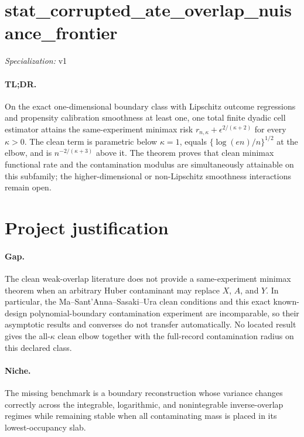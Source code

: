 \documentclass{article}
\begin{document}
\sloppy

\section*{stat\_\allowbreak{}corrupted\_\allowbreak{}ate\_\allowbreak{}overlap\_\allowbreak{}nuisance\_\allowbreak{}frontier}

\noindent\textit{Specialization:} v1\par

\paragraph{TL;DR.} On the exact one-dimensional boundary class with Lipschitz outcome regressions and propensity calibration smoothness at least one, one total finite dyadic cell estimator attains the same-experiment minimax risk \(r_{n,\kappa}+\epsilon^{2/(\kappa+2)}\) for every \(\kappa>0\). The clean term is parametric below \(\kappa=1\), equals \(\{\log(en)/n\}^{1/2}\) at the elbow, and is \(n^{-2/(\kappa+3)}\) above it. The theorem proves that clean minimax functional rate and the contamination modulus are simultaneously attainable on this subfamily; the higher-dimensional or non-Lipschitz smoothness interactions remain open.

\section{Project justification}

\paragraph{Gap.} The clean weak-overlap literature does not provide a same-experiment minimax theorem when an arbitrary Huber contaminant may replace \(X\), \(A\), and \(Y\). In particular, the Ma--Sant'Anna--Sasaki--Ura clean conditions and this exact known-design polynomial-boundary contamination experiment are incomparable, so their asymptotic results and converses do not transfer automatically. No located result gives the all-\(\kappa\) clean elbow together with the full-record contamination radius on this declared class.

\paragraph{Niche.} The missing benchmark is a boundary reconstruction whose variance changes correctly across the integrable, logarithmic, and nonintegrable inverse-overlap regimes while remaining stable when all contaminating mass is placed in its lowest-occupancy slab.
\end{document}
